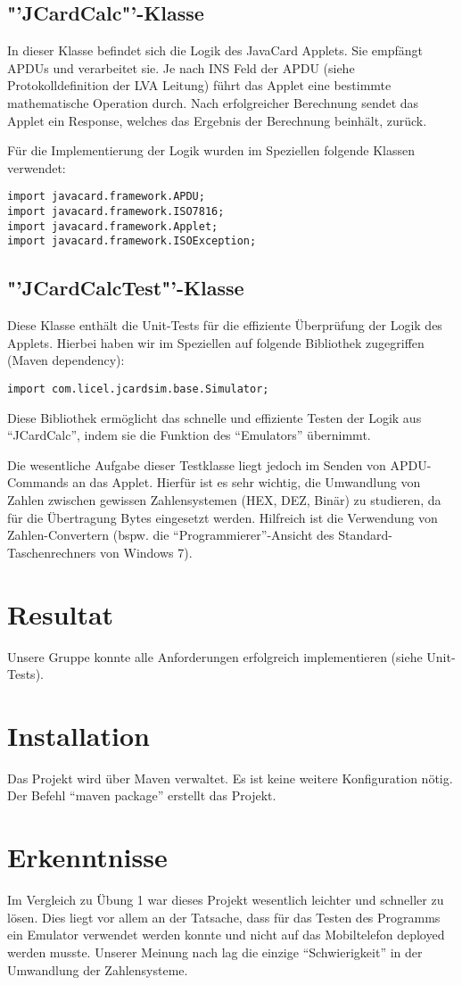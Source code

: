 \documentclass[paper=a4, fontsize=11pt]{scrartcl}
\begin{document}
\subsection{"'JCardCalc"'-Klasse}
In dieser Klasse befindet sich die Logik des JavaCard Applets. Sie empfängt APDUs und verarbeitet sie. Je nach INS Feld der APDU (siehe Protokolldefinition der LVA Leitung) führt das Applet eine bestimmte mathematische Operation durch. Nach erfolgreicher Berechnung sendet das Applet ein Response, welches das Ergebnis der Berechnung beinhält, zurück.

Für die Implementierung der Logik wurden im Speziellen folgende Klassen verwendet:
\begin{lstlisting}
import javacard.framework.APDU;
import javacard.framework.ISO7816;
import javacard.framework.Applet;
import javacard.framework.ISOException;
\end{lstlisting}

\subsection{"'JCardCalcTest"'-Klasse}
Diese Klasse enthält die Unit-Tests für die effiziente Überprüfung der Logik des Applets. Hierbei haben wir im Speziellen auf folgende Bibliothek zugegriffen (Maven dependency):
\begin{lstlisting}
import com.licel.jcardsim.base.Simulator;
\end{lstlisting}
Diese Bibliothek ermöglicht das schnelle und effiziente Testen der Logik aus "`JCardCalc"', indem sie die Funktion des "`Emulators"' übernimmt.

Die wesentliche Aufgabe dieser Testklasse liegt jedoch im Senden von APDU-Commands an das Applet. Hierfür ist es sehr wichtig, die Umwandlung von Zahlen zwischen gewissen Zahlensystemen (HEX, DEZ, Binär) zu studieren, da für die Übertragung Bytes eingesetzt werden. Hilfreich ist die Verwendung von Zahlen-Convertern (bspw. die "`Programmierer"'-Ansicht des Standard-Taschenrechners von Windows 7).

\section{Resultat}
Unsere Gruppe konnte alle Anforderungen erfolgreich implementieren (siehe Unit-Tests).

\section{Installation}
Das Projekt wird über Maven verwaltet. Es ist keine weitere Konfiguration nötig. Der Befehl "`maven package"' erstellt das Projekt.

\section{Erkenntnisse}
Im Vergleich zu Übung 1 war dieses Projekt wesentlich leichter und schneller zu lösen. Dies liegt vor allem an der Tatsache, dass für das Testen des Programms ein Emulator verwendet werden konnte und nicht auf das Mobiltelefon deployed werden musste.
Unserer Meinung nach lag die einzige "`Schwierigkeit"' in der Umwandlung der Zahlensysteme.
\end{document}
